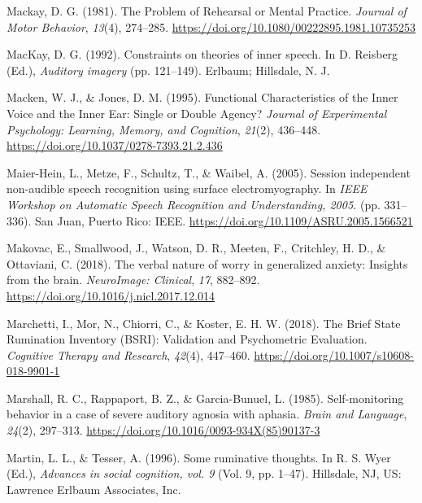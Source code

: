 \documentclass[a4paper,12pt,twoside,openright,oldfontcommands]{memoir}
\begin{document}
\leavevmode\hypertarget{ref-mackay_problem_1981}{}%
Mackay, D. G. (1981). The Problem of Rehearsal or Mental Practice. \emph{Journal of Motor Behavior}, \emph{13}(4), 274--285. \url{https://doi.org/10.1080/00222895.1981.10735253}

\leavevmode\hypertarget{ref-mackay_constraints_1992}{}%
MacKay, D. G. (1992). Constraints on theories of inner speech. In D. Reisberg (Ed.), \emph{Auditory imagery} (pp. 121--149). Erlbaum; Hillsdale, N. J.

\leavevmode\hypertarget{ref-macken_functional_1995}{}%
Macken, W. J., \& Jones, D. M. (1995). Functional Characteristics of the Inner Voice and the Inner Ear: Single or Double Agency? \emph{Journal of Experimental Psychology: Learning, Memory, and Cognition}, \emph{21}(2), 436--448. \url{https://doi.org/10.1037/0278-7393.21.2.436}

\leavevmode\hypertarget{ref-maier-hein_session_2005}{}%
Maier-Hein, L., Metze, F., Schultz, T., \& Waibel, A. (2005). Session independent non-audible speech recognition using surface electromyography. In \emph{IEEE Workshop on Automatic Speech Recognition and Understanding, 2005.} (pp. 331--336). San Juan, Puerto Rico: IEEE. \url{https://doi.org/10.1109/ASRU.2005.1566521}

\leavevmode\hypertarget{ref-makovac_verbal_2018}{}%
Makovac, E., Smallwood, J., Watson, D. R., Meeten, F., Critchley, H. D., \& Ottaviani, C. (2018). The verbal nature of worry in generalized anxiety: Insights from the brain. \emph{NeuroImage: Clinical}, \emph{17}, 882--892. \url{https://doi.org/10.1016/j.nicl.2017.12.014}

\leavevmode\hypertarget{ref-marchetti_brief_2018}{}%
Marchetti, I., Mor, N., Chiorri, C., \& Koster, E. H. W. (2018). The Brief State Rumination Inventory (BSRI): Validation and Psychometric Evaluation. \emph{Cognitive Therapy and Research}, \emph{42}(4), 447--460. \url{https://doi.org/10.1007/s10608-018-9901-1}

\leavevmode\hypertarget{ref-marshall_self-monitoring_1985}{}%
Marshall, R. C., Rappaport, B. Z., \& Garcia-Bunuel, L. (1985). Self-monitoring behavior in a case of severe auditory agnosia with aphasia. \emph{Brain and Language}, \emph{24}(2), 297--313. \url{https://doi.org/10.1016/0093-934X(85)90137-3}

\leavevmode\hypertarget{ref-Martin}{}%
Martin, L. L., \& Tesser, A. (1996). Some ruminative thoughts. In R. S. Wyer (Ed.), \emph{Advances in social cognition, vol. 9} (Vol. 9, pp. 1--47). Hillsdale, NJ, US: Lawrence Erlbaum Associates, Inc.
\end{document}
